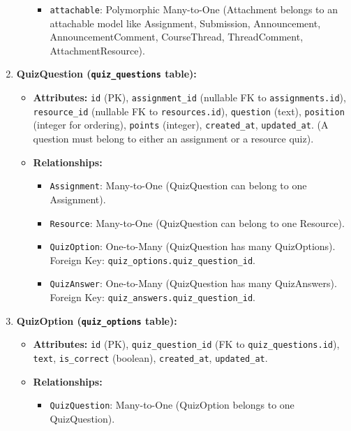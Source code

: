 \begin{enumerate}
\begin{itemize}
        \begin{itemize}
            \item \texttt{attachable}: Polymorphic Many-to-One (Attachment belongs to an attachable model like Assignment, Submission, Announcement, AnnouncementComment, CourseThread, ThreadComment, AttachmentResource).
        \end{itemize}
    \end{itemize}
    \item \textbf{QuizQuestion (\texttt{quiz\_questions} table):}
    \begin{itemize}
        \item \textbf{Attributes:} \texttt{id} (PK), \texttt{assignment\_id} (nullable FK to \texttt{assignments.id}), \texttt{resource\_id} (nullable FK to \texttt{resources.id}), \texttt{question} (text), \texttt{position} (integer for ordering), \texttt{points} (integer), \texttt{created\_at}, \texttt{updated\_at}. (A question must belong to either an assignment or a resource quiz).
        \item \textbf{Relationships:}
        \begin{itemize}
            \item \texttt{Assignment}: Many-to-One (QuizQuestion can belong to one Assignment).
            \item \texttt{Resource}: Many-to-One (QuizQuestion can belong to one Resource).
            \item \texttt{QuizOption}: One-to-Many (QuizQuestion has many QuizOptions). Foreign Key: \texttt{quiz\_options.quiz\_question\_id}.
            \item \texttt{QuizAnswer}: One-to-Many (QuizQuestion has many QuizAnswers). Foreign Key: \texttt{quiz\_answers.quiz\_question\_id}.
        \end{itemize}
    \end{itemize}
    \item \textbf{QuizOption (\texttt{quiz\_options} table):}
    \begin{itemize}
        \item \textbf{Attributes:} \texttt{id} (PK), \texttt{quiz\_question\_id} (FK to \texttt{quiz\_questions.id}), \texttt{text}, \texttt{is\_correct} (boolean), \texttt{created\_at}, \texttt{updated\_at}.
        \item \textbf{Relationships:}
        \begin{itemize}
            \item \texttt{QuizQuestion}: Many-to-One (QuizOption belongs to one QuizQuestion).

\end{itemize}
\end{itemize}
\end{enumerate}
